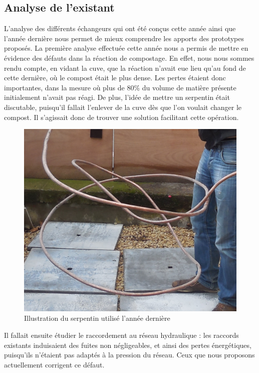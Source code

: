 \documentclass[../PS6_RapportFinal.tex]{subfiles}
\begin{document}
\graphicspath{{img/}{tex/img/}}
\subsection{Analyse de l'existant}
\label{analyseexistant}

L'analyse des différents échangeurs qui ont été conçus cette année ainsi que l'année dernière nous permet de mieux comprendre les apports des prototypes proposés. La première analyse effectuée cette année nous a permis de mettre en évidence des défauts dans la réaction de compostage. En effet, nous nous sommes rendu compte, en vidant la cuve, que la réaction n'avait eue lieu qu'au fond de cette dernière, où le compost était le plus dense. Les pertes étaient donc importantes, dans la mesure où plus de 80\% du volume de matière présente initialement n'avait pas réagi. De plus, l'idée de mettre un serpentin était discutable, puisqu’il fallait l'enlever de la cuve dès que l'on voulait changer le compost. Il s'agissait donc de trouver une solution facilitant cette opération.

\begin{figure}[!h]
\begin{center}
\includegraphics[scale=0.5]{3_1_Serpentin.JPG}
\caption{Illustration du serpentin utilisé l'année dernière}
\end{center}
\end{figure}

Il fallait ensuite étudier le raccordement au réseau hydraulique : les raccords existants induisaient des fuites non négligeables, et ainsi des pertes énergétiques, puisqu'ils n'étaient pas adaptés à la pression du réseau. Ceux que nous proposons actuellement corrigent ce défaut.
\end{document}
